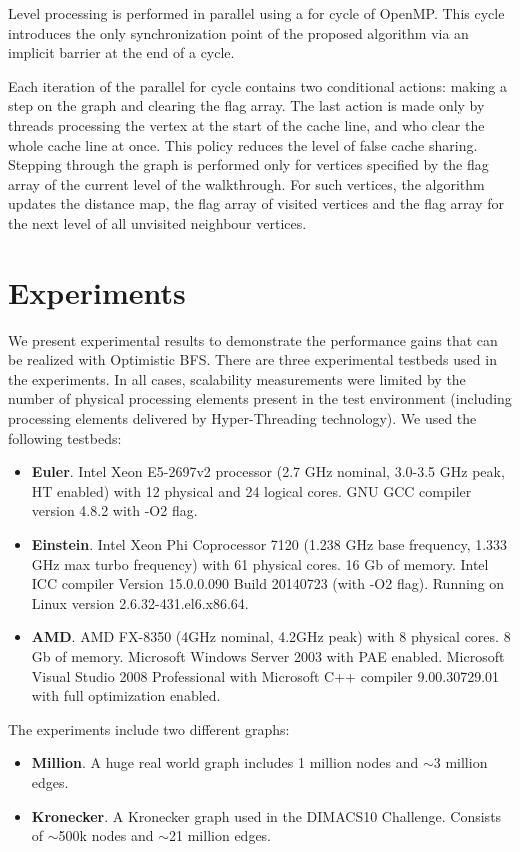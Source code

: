 \documentclass[letterpaper]{article}
\begin{document}
			Level processing is performed in parallel using a for cycle of OpenMP.
			This cycle introduces the only synchronization point of the proposed algorithm via an implicit barrier at the end of a cycle.
			
			Each iteration of the parallel for cycle contains two conditional actions: making a step on the graph and clearing the flag array.
			The last action is made only by threads processing the vertex at the start of the cache line, and who clear the whole cache line at once.
			This policy reduces the level of false cache sharing. 
			Stepping through the graph is performed only for vertices specified by the flag array of the current level of the walkthrough.
			For such vertices, the algorithm updates the distance map, the flag array of visited vertices and the flag array for the next level of all unvisited neighbour vertices.

	
	\section{Experiments}\label{sec:expe} %
		We present experimental results to demonstrate the performance gains that can be realized with Optimistic BFS.
		There are three experimental testbeds used in the experiments. 
		In all cases, scalability measurements were limited by the number of physical processing elements present in the test environment (including processing elements delivered by Hyper-Threading technology).
		We used the following testbeds:
		\begin{itemize}
			\item \textbf{Euler}. Intel Xeon E5-2697v2 processor (2.7 GHz nominal, 3.0-3.5 GHz peak, HT enabled) with 12 physical and 24 logical cores. GNU GCC compiler version 4.8.2 with -O2 flag. 
			\item \textbf{Einstein}. Intel Xeon Phi Coprocessor 7120 (1.238 GHz base frequency, 1.333 GHz max turbo frequency) with 61 physical cores. 16 Gb of memory.
			Intel ICC compiler Version 15.0.0.090 Build 20140723 (with -O2 flag).
			Running on Linux version 2.6.32-431.el6.x86.64.
			

			\item \textbf{AMD}. AMD FX-8350 (4GHz nominal, 4.2GHz peak) with 8 physical cores. 8 Gb of memory. Microsoft Windows Server 2003 with PAE enabled. Microsoft Visual Studio 2008 Professional with  Microsoft C++ compiler 9.00.30729.01 with full optimization enabled.
		\end{itemize}
		The experiments include two different graphs:
		\begin{itemize}
			\item \textbf{Million}. A huge real world graph includes 1 million nodes and $\sim$3 million edges.
			\item \textbf{Kronecker}. A Kronecker graph used in the DIMACS10 Challenge. Consists of $\sim$500k nodes and $\sim$21 million edges.
		\end{itemize}
		
\end{document}
